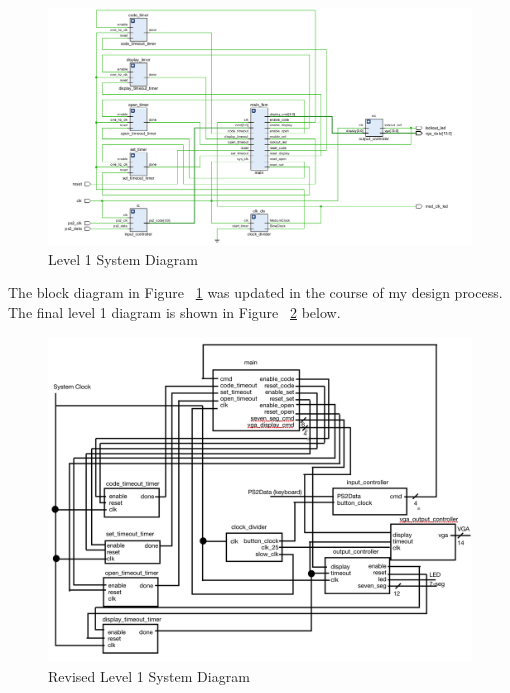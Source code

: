 \documentclass[11pt]{article}
\begin{document}
\begin{figure}[H]
\begin{center}
	\includegraphics[width=\textwidth]{../docs/images/level1.png}
	\caption{\label{fig:level1}Level 1 System Diagram}
\end{center}
\end{figure}

The block diagram in Figure ~\ref{fig:level1} was updated in the course of my design process. The final level 1 diagram is shown in Figure ~\ref{fig:level1rev} below.

\begin{figure}[H]
\begin{center}
	\includegraphics[width=\textwidth]{../docs/images/level1revised.png}
	\caption{\label{fig:level1rev}Revised Level 1 System Diagram}
\end{center}
\end{figure}
\end{document}
